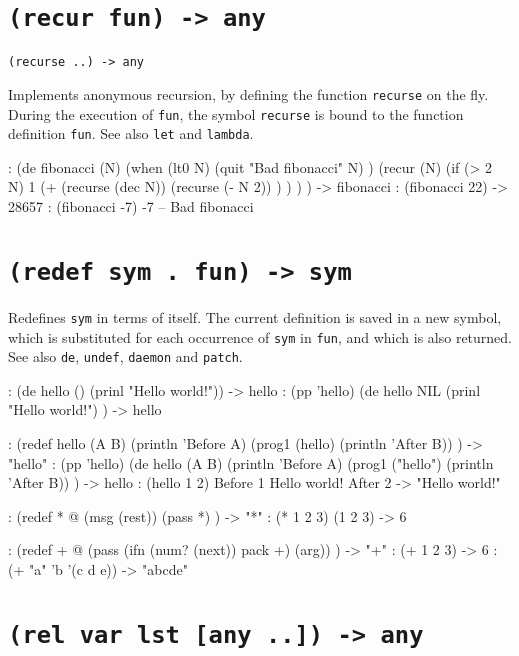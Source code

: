  
\section*{\texttt{(recur fun) -> any}}
\label{sec:func-ref-R-(recur fun) -> any}


\texttt{(recurse ..) -> any}

Implements anonymous recursion, by defining the function \texttt{recurse} on
the fly. During the execution of \texttt{fun}, the symbol \texttt{recurse} is bound to
the function definition \texttt{fun}. See also \texttt{let} and \texttt{lambda}.


\begin{wideverbatim}
: (de fibonacci (N)
   (when (lt0 N)
      (quit "Bad fibonacci" N) )
   (recur (N)
      (if (> 2 N)
         1
         (+
            (recurse (dec N))
            (recurse (- N 2)) ) ) ) )
-> fibonacci
: (fibonacci 22)
-> 28657
: (fibonacci -7)
-7 -- Bad fibonacci
\end{wideverbatim}

 
\section*{\texttt{(redef sym . fun) -> sym}}
\label{sec:func-ref-R-(redef sym . fun) -> sym}


Redefines \texttt{sym} in terms of itself. The current definition is saved in a
new symbol, which is substituted for each occurrence of \texttt{sym} in \texttt{fun},
and which is also returned. See also \texttt{de}, \texttt{undef}, \texttt{daemon} and
\texttt{patch}.


\begin{wideverbatim}
: (de hello () (prinl "Hello world!"))
-> hello
: (pp 'hello)
(de hello NIL
   (prinl "Hello world!") )
-> hello

: (redef hello (A B)
   (println 'Before A)
   (prog1 (hello) (println 'After B)) )
-> "hello"
: (pp 'hello)
(de hello (A B)
   (println 'Before A)
   (prog1 ("hello") (println 'After B)) )
-> hello
: (hello 1 2)
Before 1
Hello world!
After 2
-> "Hello world!"

: (redef * @
   (msg (rest))
   (pass *) )
-> "*"
: (* 1 2 3)
(1 2 3)
-> 6

: (redef + @
   (pass (ifn (num? (next)) pack +) (arg)) )
-> "+"
: (+ 1 2 3)
-> 6
: (+ "a" 'b '(c d e))
-> "abcde"
\end{wideverbatim}

 
\section*{\texttt{(rel var lst [any ..]) -> any}}
\label{sec:func-ref-R-(rel var lst [any ..]) -> any}


